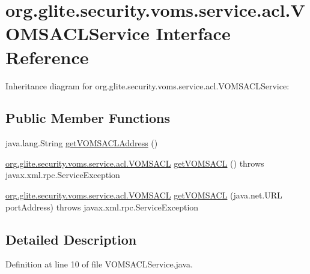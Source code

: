 \hypertarget{interfaceorg_1_1glite_1_1security_1_1voms_1_1service_1_1acl_1_1VOMSACLService}{
\section{org.glite.security.voms.service.acl.VOMSACLService Interface Reference}
\label{interfaceorg_1_1glite_1_1security_1_1voms_1_1service_1_1acl_1_1VOMSACLService}
}


Inheritance diagram for org.glite.security.voms.service.acl.VOMSACLService:
\subsection*{Public Member Functions}
\begin{DoxyCompactItemize}
\item 
java.lang.String \hyperlink{interfaceorg_1_1glite_1_1security_1_1voms_1_1service_1_1acl_1_1VOMSACLService_a2a0e8df418da68888043fa3e0bdbb9d9}{getVOMSACLAddress} ()
\item 
\hyperlink{interfaceorg_1_1glite_1_1security_1_1voms_1_1service_1_1acl_1_1VOMSACL}{org.glite.security.voms.service.acl.VOMSACL} \hyperlink{interfaceorg_1_1glite_1_1security_1_1voms_1_1service_1_1acl_1_1VOMSACLService_ac3f85bdf403cfe158482ae3f0adf9795}{getVOMSACL} ()  throws javax.xml.rpc.ServiceException
\item 
\hyperlink{interfaceorg_1_1glite_1_1security_1_1voms_1_1service_1_1acl_1_1VOMSACL}{org.glite.security.voms.service.acl.VOMSACL} \hyperlink{interfaceorg_1_1glite_1_1security_1_1voms_1_1service_1_1acl_1_1VOMSACLService_a5a8854a9d194fba2df791591033b8560}{getVOMSACL} (java.net.URL portAddress)  throws javax.xml.rpc.ServiceException
\end{DoxyCompactItemize}


\subsection{Detailed Description}


Definition at line 10 of file VOMSACLService.java.



